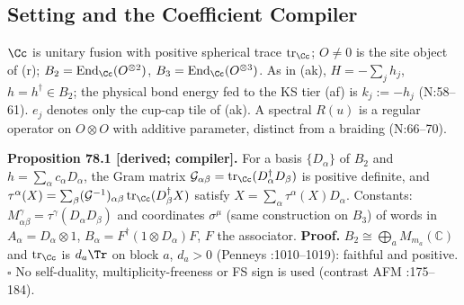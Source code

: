 
\subsection{Setting and the Coefficient Compiler}

\(\Cc\) is unitary fusion with positive spherical trace \(\operatorname{tr}_\Cc\); \(O\neq0\) is the
site object of (r); \(B_2=\operatorname{End}_\Cc(O^{\otimes2})\),
\(B_3=\operatorname{End}_\Cc(O^{\otimes3})\).  As in (ak), \(H=-\sum_jh_j\), \(h=h^\dagger\in B_2\);
the physical bond energy fed to the KS tier (af) is \(k_j:=-h_j\) (N:58--61).  \(e_j\) denotes only
the cup-cap tile of (ak).  A spectral \(R(u)\) is a regular operator on \(O\otimes O\) with additive
parameter, distinct from a braiding (N:66--70).

\textbf{Proposition 78.1 [derived; compiler].}  For a basis \(\{D_\alpha\}\) of \(B_2\) and
\(h=\sum_\alpha c_\alpha D_\alpha\), the Gram matrix \(\mathcal G_{\alpha\beta}=
\operatorname{tr}_\Cc(D_\alpha^\dagger D_\beta)\) is positive definite, and
\(\tau^\alpha(X)=\sum_\beta(\mathcal G^{-1})_{\alpha\beta}\operatorname{tr}_\Cc(D_\beta^\dagger X)\)
satisfy \(X=\sum_\alpha\tau^\alpha(X)D_\alpha\).  Constants:
\(M^\gamma_{\alpha\beta}=\tau^\gamma(D_\alpha D_\beta)\) and coordinates \(\sigma^\mu\) (same
construction on \(B_3\)) of words in \(A_\alpha=D_\alpha\otimes1\), \(B_\alpha=F^\dagger(1\otimes
D_\alpha)F\), \(F\) the associator.  \textbf{Proof.} \(B_2\cong\bigoplus_aM_{m_a}(\mathbb C)\) and
\(\operatorname{tr}_\Cc\) is \(d_a\Tr\) on block \(a\), \(d_a>0\) (Penneys :1010--1019): faithful
and positive.  \(\square\)  No self-duality, multiplicity-freeness or FS sign is used (contrast AFM
:175--184).

